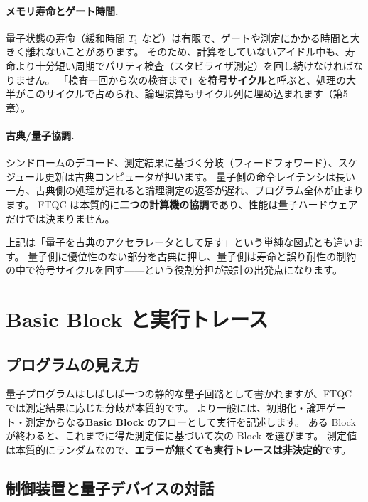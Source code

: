 \paragraph{メモリ寿命とゲート時間.}
量子状態の寿命（緩和時間 $T_1$ など）は有限で、ゲートや測定にかかる時間と大きく離れないことがあります。
そのため、計算をしていないアイドル中も、寿命より十分短い周期でパリティ検査（スタビライザ測定）を回し続けなければなりません。
「検査一回から次の検査まで」を\textbf{符号サイクル}と呼ぶと、処理の大半がこのサイクルで占められ、論理演算もサイクル列に埋め込まれます（第5章）。

\paragraph{古典/量子協調.}
シンドロームのデコード、測定結果に基づく分岐（フィードフォワード）、スケジュール更新は古典コンピュータが担います。
量子側の命令レイテンシは長い一方、古典側の処理が遅れると論理測定の返答が遅れ、プログラム全体が止まります。
FTQC は本質的に\textbf{二つの計算機の協調}であり、性能は量子ハードウェアだけでは決まりません。

\begin{notebox}
  上記は「量子を古典のアクセラレータとして足す」という単純な図式とも違います。
  量子側に優位性のない部分を古典に押し、量子側は寿命と誤り耐性の制約の中で符号サイクルを回す——という役割分担が設計の出発点になります。
\end{notebox}

\section{Basic Block と実行トレース}\label{sec:basic_block}

\subsection{プログラムの見え方}

量子プログラムはしばしば一つの静的な量子回路として書かれますが、FTQC では測定結果に応じた分岐が本質的です。
より一般には、初期化・論理ゲート・測定からなる\textbf{Basic Block} のフローとして実行を記述します。
ある Block が終わると、これまでに得た測定値に基づいて次の Block を選びます。
測定値は本質的にランダムなので、\textbf{エラーが無くても実行トレースは非決定的}です。

\subsection{制御装置と量子デバイスの対話}

